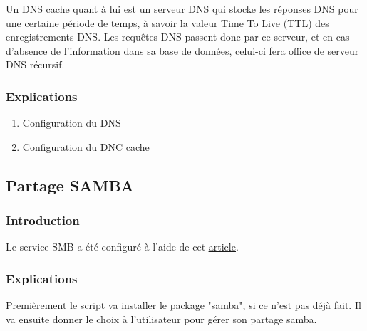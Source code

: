 \documentclass{article}
\begin{document}
	Un DNS cache quant à lui est un serveur DNS qui stocke les réponses DNS pour une certaine période de temps, à savoir la valeur Time To Live (TTL) des enregistrements DNS. Les requêtes DNS passent donc par ce serveur, et en cas d'absence de l'information dans sa base de données, celui-ci fera office de serveur DNS récursif.

	\subsubsection{Explications}
	
	\begin{enumerate}
	\item Configuration du DNS
	\item Configuration du DNC cache
	
	\end{enumerate}	
	
	\subsection{Partage SAMBA}
	\subsubsection{Introduction}

Le service SMB a été configuré à l'aide de cet \href{https://docs.fedoraproject.org/en-US/quick-docs/samba/}{\underline{article}}.
	
	\subsubsection{Explications}

	Premièrement le script va installer le package "samba", si ce n'est pas déjà fait.
	Il va ensuite donner le choix à l'utilisateur pour gérer son partage samba.
	 
\end{document}
